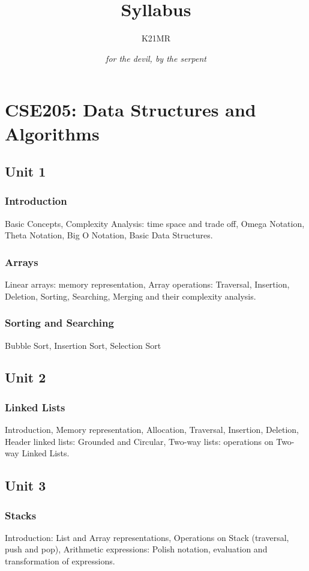 \documentclass[twocolumn]{article}
\title{Syllabus}
\author{K21MR}
\date{\emph{for the devil, by the serpent}}
\begin{document}
    \maketitle
    \section*{CSE205: Data Structures and Algorithms}
    \subsection*{Unit 1}
    \subsubsection*{Introduction}
    Basic Concepts, Complexity Analysis: time space and trade off, Omega Notation, Theta Notation, Big O Notation, Basic Data Structures.
    \subsubsection*{Arrays}
    Linear arrays: memory representation, Array operations: Traversal, Insertion, Deletion, Sorting, Searching, Merging and their complexity analysis.
    \subsubsection*{Sorting and Searching}
    Bubble Sort, Insertion Sort, Selection Sort
    \subsection*{Unit 2}
    \subsubsection*{Linked Lists}
    Introduction, Memory representation, Allocation, Traversal, Insertion, Deletion, Header linked lists: Grounded and Circular, Two-way lists: operations on Two-way Linked Lists.
    \subsection*{Unit 3}
    \subsubsection*{Stacks}
    Introduction: List and Array representations, Operations on Stack (traversal, push and pop), Arithmetic expressions: Polish notation, evaluation and transformation of expressions.
\end{document}
